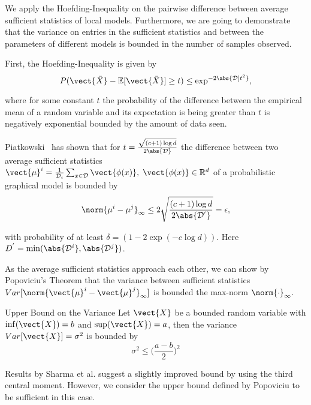 We apply the Hoefding-Inequality on the pairwise difference between average sufficient statistics of local models.
Furthermore, we are going to demonstrate that the variance on entries in the sufficient statistics and between the parameters of different models is bounded in the number of samples observed.

First, the Hoefding-Inequality is given by
\begin{equation}
    P(\vect{\bar{X}} - \mathbb{E}[\vect{\bar{X}}] \geq t ) \leq \exp^{-2\abs{\mathcal{D}]t^2}},
\end{equation}

where for some constant $t$ the probability of the difference between the empirical mean of a random variable and its expectation is being greater than $t$ is negatively exponential bounded by the amount of data seen.

Piatkowski~\cite{piatkowski2019distributed} has shown that for $t = \frac{\sqrt{(c+1) \log d}}{2\abs{\mathcal{D}}}$ the difference between two average sufficient statistics $\vect{\mu}^i = \frac{1}{\mathcal{D}_i} \sum_{x \in \mathcal{D}} \vect{\phi(x)}, \; \vect{\phi(x)} \in \mathbb{R}^d$ of a probabilistic graphical model is bounded by
\begin{equation}
    \label{eq:hoefd}
    \norm{\mu^{i} -  \mu^{j}}_\infty \leq 2 \sqrt{
        \frac{(c+1) \log d}
        {2\abs{\mathcal{D^{'}}}}
        } = \epsilon,
\end{equation}

with probability of at least $\delta= (1- 2 \exp(-c \log d))$. Here $D^{'} = \min(\abs{\mathcal{D}^i}, \abs{\mathcal{D}^j})$.

As the average sufficient statistics approach each other, we can show by Popoviciu's Theorem \cite{popoviciu1935equations} that the variance between sufficient statistics $Var[\norm{\vect{\mu}^{i} -  \vect{\mu}^{j}}_\infty]$ is bounded \wrt the max-norm $\norm{\cdot}_{\infty}$.
\begin{threm}{Upper Bound on the Variance}
    Let $\vect{X}$ be a bounded random variable with $\inf(\vect{X}) = b$ and $\sup(\vect{X}) = a$, 
    then the variance $Var[\vect{X}] = \sigma^2$ is bounded by 
    \begin{equation}
        \sigma^2 \leq \bigg(\frac{a-b}{2}\bigg)^{2}
    \end{equation}
\end{threm}

Results by Sharma et al. \cite{sharma2010betterbounds} suggest a slightly improved bound by using the third central moment.
However, we consider the upper bound defined by Popoviciu to be sufficient in this case.

